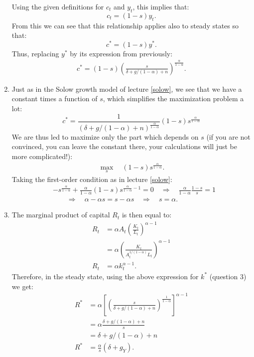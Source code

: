 \documentclass[]{book}
\theoremstyle{definition}
\theoremstyle{definition}
\theoremstyle{definition}
\theoremstyle{remark}
\begin{document}
\begin{enumerate}
  Using the given definitions for \(c_t\) and \(y_t\), this implies
  that: \[c_t = (1-s)y_t.\] From this we can see that this relationship
  applies also to steady states so that: \[c^{*} = (1-s)y^{*}.\] Thus,
  replacing \(y^{*}\) by its expression from previously: \[
  \begin{aligned}
  \boxed{c^{*}=(1-s)\left(\frac{s}{\delta+g/(1-\alpha)+n}\right)^{\frac{\alpha}{1-\alpha}}}.
  \end{aligned}
  \]
\item
  Just as in the Solow growth model of lecture \ref{solow}, we see that
  we have a constant times a function of \(s\), which simplifies the
  maximization problem a lot:
  \[c^{*}=\frac{1}{\left(\delta+g/(1-\alpha)+n\right)^{\frac{\alpha}{1-\alpha}}} (1-s)s^{\frac{\alpha}{1-\alpha}}\]
  We are thus led to maximize only the part which depends on \(s\) (if
  you are not convinced, you can leave the constant there, your
  calculations will just be more complicated!): \[
  \begin{aligned}
  \max_s \quad  (1-s)s^{\frac{\alpha}{1-\alpha}}.
  \end{aligned}
  \] Taking the first-order condition as in lecture \ref{solow}: \[
  \begin{aligned}
  &-s^{\frac{\alpha}{1-\alpha}}+\frac{\alpha}{1-\alpha}(1-s)s^{\frac{\alpha}{1-\alpha}-1} =0 \quad \Rightarrow\quad\frac{\alpha}{1-\alpha}\frac{1-s}{s}=1\\
  &\quad \quad \Rightarrow\quad\alpha-\alpha s=s-\alpha s \quad\Rightarrow\quad\boxed{s=\alpha}.
  \end{aligned}
  \]
\item
  The marginal product of capital \(R_t\) is then equal to: \[
  \begin{aligned}
  R_t&=\alpha A_t \left(\frac{K_t}{L_t}\right)^{\alpha-1}\\
  &=\alpha \left(\frac{K_t}{A_t^{1/(1-\alpha)} L_t}\right)^{\alpha-1}\\
  R_t&=\alpha k_t^{\alpha-1}.
  \end{aligned}
  \] Therefore, in the steady state, using the above expression for
  \(k^{*}\) (question 3) we get: \[
  \begin{aligned}
  R^{*}&=\alpha \left[\left(\frac{s}{\delta + g/(1-\alpha)+n}\right)^{\frac{1}{1-\alpha}}\right]^{\alpha-1}\\
  &=\alpha \frac{\delta + g/(1-\alpha)+n}{s}\\
  &=\delta + g/(1-\alpha)+n\\
  R^{*}&=\frac{\alpha}{s}\left(\delta + g_Y\right).

\end{aligned}\]
\end{enumerate}
\end{document}
